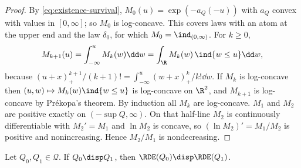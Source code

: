 \begin{proof}
By \eqref{eq:existence-survival}, $M_0(u)=\exp(-a_Q(-u))$ with $a_Q$ convex with values in
$[0,\infty]$; so $M_0$ is log-concave. This covers laws with an atom at the upper end and the
law $\delta_0$, for which $M_0=\ind_{(0,\infty)}$. For $k\ge0$,
\[
  M_{k+1}(u)=\int_{-\infty}^uM_k(w)\dd w=\int_\R M_k(w)\,\ind\{w\le u\}\dd w ,
\]
because $(u+x)_+^{k+1}/(k+1)!=\int_{-\infty}^u(w+x)_+^k/k!\dd w$. If $M_k$ is log-concave then
$(u,w)\mapsto M_k(w)\ind\{w\le u\}$ is log-concave on $\R^2$, and $M_{k+1}$ is log-concave by
Pr\'ekopa's theorem. By induction all $M_k$ are log-concave. $M_1$ and $M_2$ are positive
exactly on $(-\sup Q,\infty)$. On that half-line $M_2$ is continuously differentiable with
$M_2'=M_1$ and $\ln M_2$ is concave, so $(\ln M_2)'=M_1/M_2$ is positive and nonincreasing.
Hence $M_2/M_1$ is nondecreasing.
\end{proof}

\begin{theorem}[monotonicity]\label{thm:mono}
Let $Q_0,Q_1\in\mathcal{Q}$. If $Q_0\disp Q_1$, then
$\RDE(Q_0)\disp\RDE(Q_1)$.
\end{theorem}

